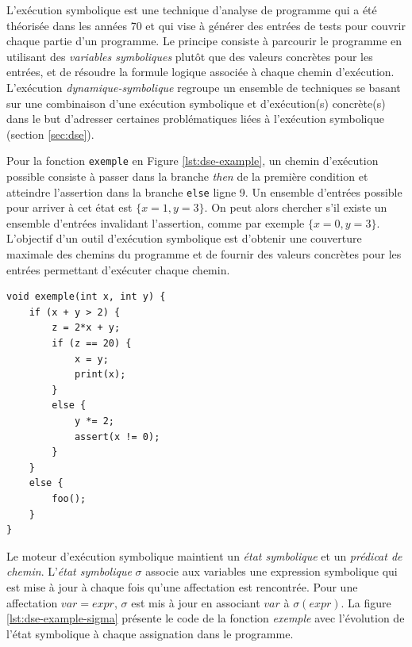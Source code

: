             L'exécution symbolique est une technique d'analyse de programme qui a été théorisée dans les années 70 \cite{Boyer/ACM75, King/ACM76, Clarke/TSE76} et qui vise à générer des entrées de tests pour couvrir chaque partie d'un programme. Le principe consiste à parcourir le programme en utilisant des \textit{variables symboliques} plutôt que des valeurs concrètes pour les entrées, et de résoudre la formule logique associée à chaque chemin d'exécution. 
            L'exécution \textit{dynamique-symbolique} regroupe un ensemble de techniques se basant sur une combinaison d'une exécution symbolique et d'exécution(s) concrète(s) dans le but d'adresser certaines problématiques liées à l'exécution symbolique (section \ref{sec:dse}).
            
            Pour la fonction \texttt{exemple} en Figure \ref{lst:dse-example}, un chemin d'exécution possible consiste à passer dans la branche \textit{then} de la première condition et atteindre l'assertion dans la branche \texttt{else} ligne 9. Un ensemble d'entrées possible pour arriver à cet état est $\{x = 1, y = 3\}$. On peut alors chercher s'il existe un ensemble d'entrées invalidant l'assertion, comme par exemple $\{x = 0, y = 3\}$. L'objectif d'un outil d'exécution symbolique est d'obtenir une couverture maximale des chemins du programme et de fournir des valeurs concrètes pour les entrées permettant d'exécuter chaque chemin.
   
            \begin{center}
            \lstset{language=C,style=codeC}    
            \begin{lstlisting}[caption=La fonction exemple, label=lst:dse-example]
void exemple(int x, int y) { 
    if (x + y > 2) {          
        z = 2*x + y;              
        if (z == 20) {       
            x = y;        
            print(x);          
        }
        else {         
            y *= 2;      
            assert(x != 0);
        }
    }
    else {                  
        foo();             
    }
}
            \end{lstlisting}
            \end{center}    
                
            Le moteur d'exécution symbolique maintient un \textit{état symbolique} et un \textit{prédicat de chemin}.
            L'\textit{état symbolique} $\sigma$ associe aux variables une expression symbolique qui est mise à jour à chaque fois qu'une affectation est rencontrée. Pour une affectation $var = expr$, $\sigma$ est mis à jour en associant $var$ à $\sigma(expr)$. La figure \ref{lst:dse-example-sigma} présente le code de la fonction \textit{exemple} avec l'évolution de l'état symbolique à chaque assignation dans le programme.
            
